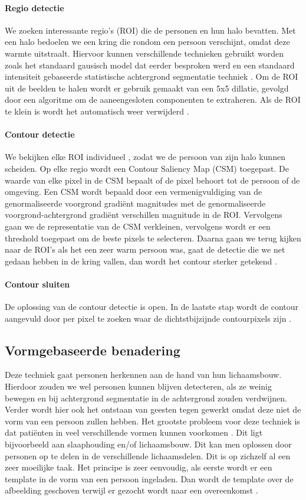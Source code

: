 \paragraph{Regio detectie}
We zoeken interessante regio's (ROI) die de personen en hun halo bevatten. Met een halo bedoelen we een kring die rondom een persoon verschijnt, omdat deze warmte uitstraalt. Hiervoor kunnen verschillende technieken gebruikt worden zoals  het standaard gausisch model dat eerder besproken werd en een standaard intensiteit gebaseerde statistische achtergrond segmentatie techniek \cite{bibBET6}. Om de ROI uit de beelden te halen wordt er gebruik gemaakt van een 5x5 dillatie, gevolgd door een algoritme om de aaneengesloten componenten te extraheren. Als de ROI te klein is wordt het automatisch weer verwijderd \cite{bibBET5}.

\paragraph{Contour detectie}
We bekijken elke ROI individueel , zodat we de persoon van zijn halo kunnen scheiden. Op elke regio wordt een Contour Saliency Map (CSM) toegepast. De waarde van elke pixel in de CSM bepaalt of de pixel behoort tot de persoon of de omgeving. Een CSM wordt bepaald door een vermenigvuldiging van de genormaliseerde voorgrond gradi\"ent magnitudes met de genormaliseerde voorgrond-achtergrond gradi\"ent verschillen magnitude in de ROI. Vervolgens gaan we de representatie van de CSM verkleinen, vervolgens wordt er een threshold toegepast om de beste pixels te selecteren. Daarna gaan we terug kijken naar de ROI's als het een zeer warm persoon was, gaat de detectie die we net gedaan hebben in de kring vallen, dan wordt het contour sterker getekend \cite{bibBET5}.

\paragraph{Contour sluiten}
De oplossing van de contour detectie is open. In de laatste stap wordt de contour aangevuld door per pixel te zoeken waar de dichtstbijzijnde contourpixels zijn \cite{bibBET5}.

\subsection{Vormgebaseerde benadering}
\label{refVBB}
Deze techniek gaat personen herkennen aan de hand van hun lichaamsbouw. Hierdoor zouden we wel personen kunnen blijven detecteren, als ze weinig bewegen en bij achtergrond segmentatie in de achtergrond zouden verdwijnen. Verder wordt hier ook het ontstaan van geesten tegen gewerkt omdat deze niet de vorm van een persoon zullen hebben. Het grootste probleem voor deze techniek is dat pati\"enten in veel verschillende vormen kunnen voorkomen \cite{bibIRC}. Dit ligt bijvoorbeeld aan slaaphouding en/of lichaamsbouw. Dit kan men oplossen door personen op te delen in de verschillende lichaamsdelen. Dit is op zichzelf al een zeer moeilijke taak.  
Het principe is zeer eenvoudig, als eerste wordt er een template in de vorm van een persoon ingeladen. Dan wordt de template over de afbeelding geschoven terwijl er gezocht wordt naar een overeenkomst \cite{bibIRC4}.

